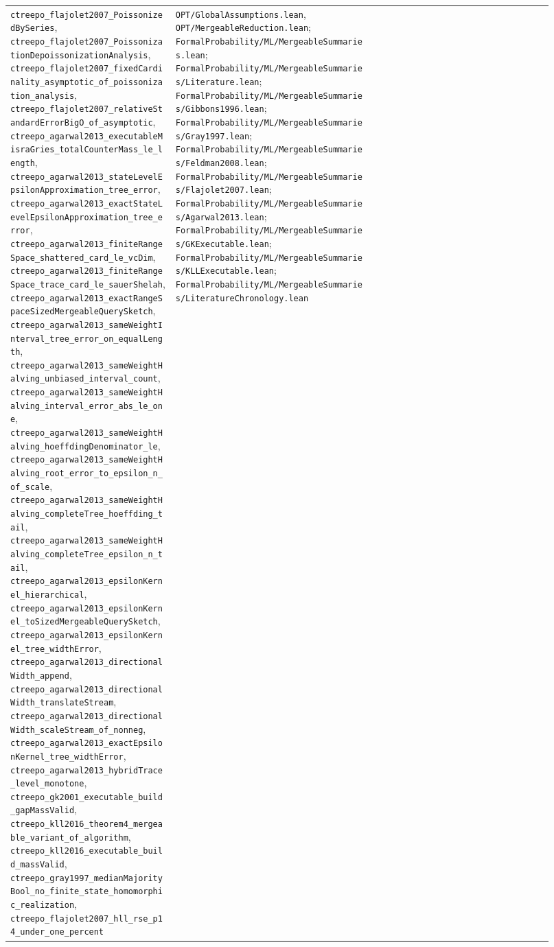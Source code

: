 {\begin{longtable}{p{0.28\linewidth}p{0.34\linewidth}p{0.30\linewidth}}
\nolinkurl{ctreepo_flajolet2007_PoissonizedBySeries},
\nolinkurl{ctreepo_flajolet2007_PoissonizationDepoissonizationAnalysis},
\nolinkurl{ctreepo_flajolet2007_fixedCardinality_asymptotic_of_poissonization_analysis},
\texttt{ctreepo\_flajolet2007\_relativeStandardErrorBigO\_of\_asymptotic},
\nolinkurl{ctreepo_agarwal2013_executableMisraGries_totalCounterMass_le_length},
\nolinkurl{ctreepo_agarwal2013_stateLevelEpsilonApproximation_tree_error},
\nolinkurl{ctreepo_agarwal2013_exactStateLevelEpsilonApproximation_tree_error},
\nolinkurl{ctreepo_agarwal2013_finiteRangeSpace_shattered_card_le_vcDim},
\nolinkurl{ctreepo_agarwal2013_finiteRangeSpace_trace_card_le_sauerShelah},
\nolinkurl{ctreepo_agarwal2013_exactRangeSpaceSizedMergeableQuerySketch},
\nolinkurl{ctreepo_agarwal2013_sameWeightInterval_tree_error_on_equalLength},
\nolinkurl{ctreepo_agarwal2013_sameWeightHalving_unbiased_interval_count},
\nolinkurl{ctreepo_agarwal2013_sameWeightHalving_interval_error_abs_le_one},
\nolinkurl{ctreepo_agarwal2013_sameWeightHalving_hoeffdingDenominator_le},
\nolinkurl{ctreepo_agarwal2013_sameWeightHalving_root_error_to_epsilon_n_of_scale},
\nolinkurl{ctreepo_agarwal2013_sameWeightHalving_completeTree_hoeffding_tail},
\nolinkurl{ctreepo_agarwal2013_sameWeightHalving_completeTree_epsilon_n_tail},
\texttt{ctreepo\_agarwal2013\_epsilonKernel\_hierarchical},
\nolinkurl{ctreepo_agarwal2013_epsilonKernel_toSizedMergeableQuerySketch},
\nolinkurl{ctreepo_agarwal2013_epsilonKernel_tree_widthError},
\nolinkurl{ctreepo_agarwal2013_directionalWidth_append},
\nolinkurl{ctreepo_agarwal2013_directionalWidth_translateStream},
\nolinkurl{ctreepo_agarwal2013_directionalWidth_scaleStream_of_nonneg},
\nolinkurl{ctreepo_agarwal2013_exactEpsilonKernel_tree_widthError},
\texttt{ctreepo\_agarwal2013\_hybridTrace\_level\_monotone},
\texttt{ctreepo\_gk2001\_executable\_build\_gapMassValid},
\texttt{ctreepo\_kll2016\_theorem4\_mergeable\_variant\_of\_algorithm},
\texttt{ctreepo\_kll2016\_executable\_build\_massValid},
\texttt{ctreepo\_gray1997\_medianMajorityBool\_no\_finite\_state\_homomorphic\_realization},
\texttt{ctreepo\_flajolet2007\_hll\_rse\_p14\_under\_one\_percent} &
\texttt{OPT/GlobalAssumptions.lean}, \texttt{OPT/MergeableReduction.lean};
\texttt{FormalProbability/ML/MergeableSummaries.lean};
\texttt{FormalProbability/ML/MergeableSummaries/Literature.lean};
\texttt{FormalProbability/ML/MergeableSummaries/Gibbons1996.lean};
\texttt{FormalProbability/ML/MergeableSummaries/Gray1997.lean};
\texttt{FormalProbability/ML/MergeableSummaries/Feldman2008.lean};
\texttt{FormalProbability/ML/MergeableSummaries/Flajolet2007.lean};
\texttt{FormalProbability/ML/MergeableSummaries/Agarwal2013.lean};
\texttt{FormalProbability/ML/MergeableSummaries/GKExecutable.lean};
\texttt{FormalProbability/ML/MergeableSummaries/KLLExecutable.lean};
\texttt{FormalProbability/ML/MergeableSummaries/LiteratureChronology.lean} \\


\end{longtable}}
